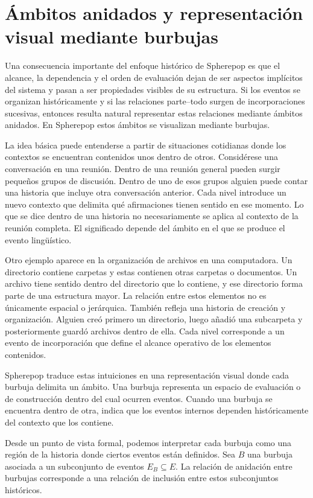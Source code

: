 \documentclass[12pt]{article}
\begin{document}
\section{Ámbitos anidados y representación visual mediante burbujas}

Una consecuencia importante del enfoque histórico de Spherepop es que el alcance, la dependencia y el orden de evaluación dejan de ser aspectos implícitos del sistema y pasan a ser propiedades visibles de su estructura. Si los eventos se organizan históricamente y si las relaciones parte--todo surgen de incorporaciones sucesivas, entonces resulta natural representar estas relaciones mediante ámbitos anidados. En Spherepop estos ámbitos se visualizan mediante burbujas.

La idea básica puede entenderse a partir de situaciones cotidianas donde los contextos se encuentran contenidos unos dentro de otros. Considérese una conversación en una reunión. Dentro de una reunión general pueden surgir pequeños grupos de discusión. Dentro de uno de esos grupos alguien puede contar una historia que incluye otra conversación anterior. Cada nivel introduce un nuevo contexto que delimita qué afirmaciones tienen sentido en ese momento. Lo que se dice dentro de una historia no necesariamente se aplica al contexto de la reunión completa. El significado depende del ámbito en el que se produce el evento lingüístico.

Otro ejemplo aparece en la organización de archivos en una computadora. Un directorio contiene carpetas y estas contienen otras carpetas o documentos. Un archivo tiene sentido dentro del directorio que lo contiene, y ese directorio forma parte de una estructura mayor. La relación entre estos elementos no es únicamente espacial o jerárquica. También refleja una historia de creación y organización. Alguien creó primero un directorio, luego añadió una subcarpeta y posteriormente guardó archivos dentro de ella. Cada nivel corresponde a un evento de incorporación que define el alcance operativo de los elementos contenidos.

Spherepop traduce estas intuiciones en una representación visual donde cada burbuja delimita un ámbito. Una burbuja representa un espacio de evaluación o de construcción dentro del cual ocurren eventos. Cuando una burbuja se encuentra dentro de otra, indica que los eventos internos dependen históricamente del contexto que los contiene.

Desde un punto de vista formal, podemos interpretar cada burbuja como una región de la historia donde ciertos eventos están definidos. Sea \(B\) una burbuja asociada a un subconjunto de eventos \(E_B \subseteq E\). La relación de anidación entre burbujas corresponde a una relación de inclusión entre estos subconjuntos históricos.
\end{document}
